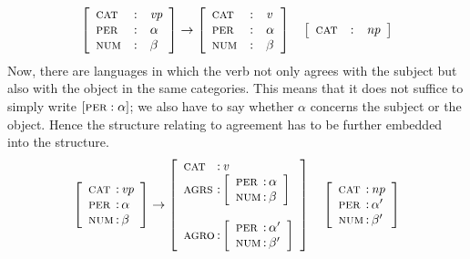 \begin{equation}
\left[\begin{array}{l@{\quad : \quad}l}
\mbox{\sc cat} & \mbox{\it vp} \\
\mbox{\sc per} & \alpha \\
\mbox{\sc num} & \beta
\end{array}\right]
\pf
\left[\begin{array}{l@{\quad : \quad}l}
\mbox{\sc cat} & \mbox{\it v} \\
\mbox{\sc per} & \alpha \\
\mbox{\sc num} & \beta
\end{array}\right]
\quad
\left[\begin{array}{l@{\quad : \quad}l}
\mbox{\sc cat} & \mbox{\it np}
\end{array}\right]
\end{equation}
Now, there are languages in which the verb not only agrees with
the subject but also with the object in the same categories. This
means that it does not suffice to simply write $[\mbox{\sc per} : \alpha]$;
we also have to say whether $\alpha$ concerns the subject or
the object. Hence the structure relating to agreement has
to be further embedded into the structure. 
\begin{equation}
\left[
\begin{array}{l@{\, : \,}l}
    \mbox{\sc cat} & \mbox{\it vp} \\
    \mbox{\sc per} & \alpha \\
    \mbox{\sc num} & \beta
\end{array}\right]
\pf
\left[
\begin{array}{l@{\, : \,}l}
    \mbox{\sc cat} & \mbox{\it v} \\
    \mbox{\sc agrs} & \left[
        \begin{array}{l@{\, : \,}l}
            \mbox{\sc per} & \alpha \\
            \mbox{\sc num} & \beta
        \end{array}\right] \\
\multicolumn{2}{l}{}    \\
    \mbox{\sc agro} & \left[
        \begin{array}{l@{\, : \,}l}
            \mbox{\sc per} & \alpha' \\
            \mbox{\sc num} & \beta'
        \end{array}\right]
\end{array}\right]
\quad
\left[\begin{array}{l@{\, : \,}l}
\mbox{\sc cat} & \mbox{\it np} \\
\mbox{\sc per} & \alpha' \\
\mbox{\sc num} & \beta'
\end{array}\right]
\end{equation}
